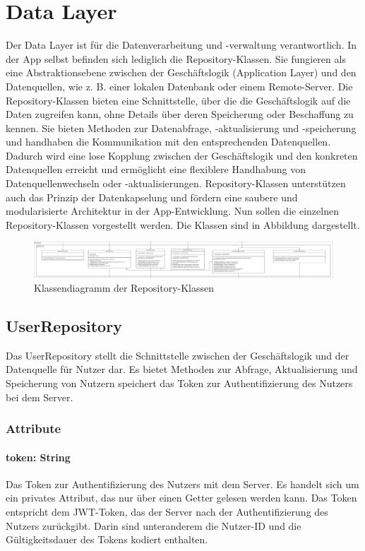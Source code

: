 \documentclass[parskip=full]{scrartcl}
\begin{document}
\section{Data Layer}
Der Data Layer ist für die Datenverarbeitung und -verwaltung verantwortlich. In der App selbst befinden sich lediglich die Repository-Klassen. Sie fungieren als eine Abstraktionsebene zwischen der Geschäftslogik (Application Layer) und den Datenquellen, wie z. B. einer lokalen Datenbank oder einem Remote-Server. Die Repository-Klassen bieten eine Schnittstelle, über die die Geschäftslogik auf die Daten zugreifen kann, ohne Details über deren Speicherung oder Beschaffung zu kennen. Sie bieten Methoden zur Datenabfrage, -aktualisierung und -speicherung und handhaben die Kommunikation mit den entsprechenden Datenquellen. Dadurch wird eine lose Kopplung zwischen der Geschäftslogik und den konkreten Datenquellen erreicht und ermöglicht eine flexiblere Handhabung von Datenquellenwechseln oder -aktualisierungen. Repository-Klassen unterstützen auch das Prinzip der Datenkapselung und fördern eine saubere und modularisierte Architektur in der App-Entwicklung.
Nun sollen die einzelnen Repository-Klassen vorgestellt werden. Die Klassen sind in Abbildung  dargestellt.
\begin{figure}[htp]
    \centering
    \includegraphics[width=\textwidth]{images/dataLayer/dataLayer.pdf}
    \caption{Klassendiagramm der Repository-Klassen}
    \label{fig:dataLayer}
\end{figure}

\subsection{UserRepository}
Das UserRepository stellt die Schnittstelle zwischen der Geschäftslogik und der Datenquelle für Nutzer dar. Es bietet Methoden zur Abfrage, Aktualisierung und Speicherung von Nutzern speichert das Token zur Authentifizierung des Nutzers bei dem Server.
\subsubsection{Attribute}
\paragraph{token: String}
Das Token zur Authentifizierung des Nutzers mit dem Server. Es handelt sich um ein privates Attribut, das nur über einen Getter gelesen werden kann. Das Token entspricht dem JWT-Token, das der Server nach der Authentifizierung des Nutzers zurückgibt. Darin sind unteranderem die Nutzer-ID und die Gültigkeitsdauer des Tokens kodiert enthalten.
\end{document}
